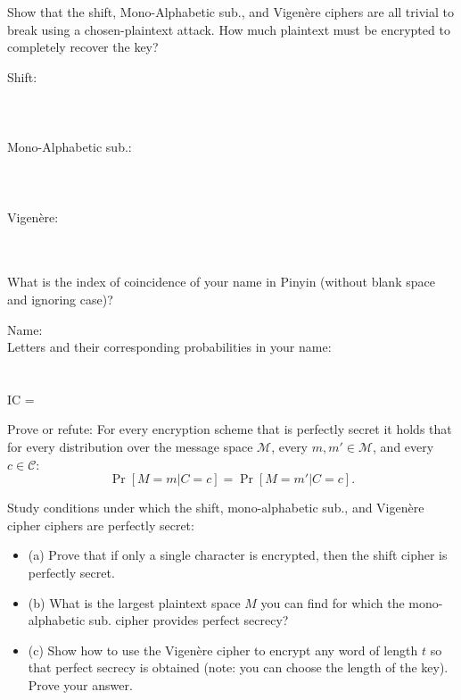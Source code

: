 \documentclass[12pt,letterpaper,boxed]{amspset}
\begin{document}
\begin{problem}[1.5]
Show that the shift, Mono-Alphabetic sub., and Vigen\`{e}re ciphers are all trivial to break using a chosen-plaintext attack. How much plaintext must be encrypted to completely recover the key?  
\end{problem}

\begin{solution}
Shift:\\
\\
\\
\\
Mono-Alphabetic sub.:\\
\\
\\
\\
Vigen\`{e}re: \\
\\
\\
\end{solution}

\begin{problem}[1.6]
What is the index of coincidence of your name in Pinyin (without blank space and ignoring case)?
\end{problem}

\begin{solution}
Name:\\
Letters and their corresponding probabilities in your name:\\
\\
\\
IC = 
\end{solution}

\begin{problem}[2.1]
Prove or refute: For every encryption scheme that is perfectly secret it holds that for every distribution over the message space $\mathcal{M}$, every $m, m' \in \mathcal{M}$, and every $c \in \mathcal{C}$:
\[ \Pr[M=m | C=c] = \Pr[M=m'|C=c].
\]
\end{problem}

\begin{solution}
\vspace{5cm}

\end{solution}

\begin{problem}[2.2]
Study conditions under which the shift, mono-alphabetic sub., and Vigen\`{e}re cipher ciphers are perfectly secret:
\begin{itemize}
\item (a) Prove that if only a single character is encrypted, then the shift cipher is perfectly secret.
\item (b) What is the largest plaintext space $M$ you can find for which the mono-alphabetic sub. cipher provides perfect secrecy?
\item (c) Show how to use the Vigen\`{e}re cipher to encrypt any word of length $t$ so that perfect secrecy is obtained (note: you can choose the length of the key). Prove your answer.
\end{itemize}
\end{problem}
\end{document}
